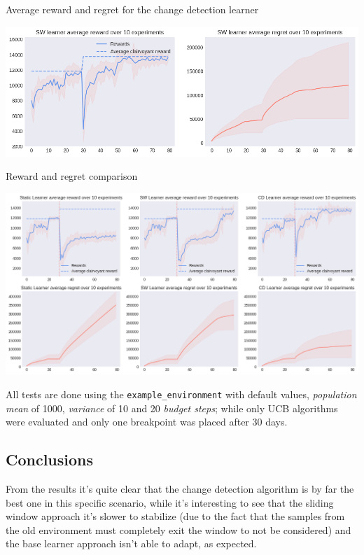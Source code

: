 Average reward and regret for the change detection learner

\begin{center}
    \includegraphics[scale=0.5]{img/Graphs/non_stationary/image3.png}
\end{center}

Reward and regret comparison

\begin{center}
    \hspace*{-3em}
    \includegraphics[scale=0.5]{img/Graphs/non_stationary/image4.png}
\end{center}

\clearpage %

All tests are done using the \texttt{example\_environment} with default values, \textit{population mean} of 1000, \textit{variance} of 10 and 20 \textit{budget steps}; while only UCB algorithms were evaluated and only one breakpoint was placed after 30 days.

\subsection{Conclusions}

From the results it's quite clear that the change detection algorithm is by far the best one in this specific scenario, while it's interesting to see that the sliding window approach it's slower to stabilize (due to the fact that the samples from the old environment must completely exit the window to not be considered) and the base learner approach isn't able to adapt, as expected.

